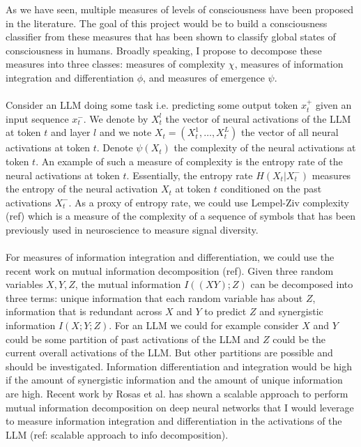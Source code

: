 \documentclass[11pt,a4paper]{article}
\begin{document}
As we have seen, multiple measures of levels of consciousness have been proposed in the literature. The goal of this project would be to build a consciousness classifier from these measures that has been shown to classify global states of consciousness in humans. Broadly speaking, I propose to decompose these measures into three classes: measures of complexity $\chi$, measures of information integration and differentiation $\phi$, and measures of emergence $\psi$. 
\\
\\
Consider an LLM doing some task i.e. predicting some output token $x_t^+$ given an input sequence $x_t^-$. We denote by $X_t^l$ the vector of neural activations of the LLM at token $t$ and layer $l$ and we note $X_t = (X_t^1, \ldots, X_t^L)$ the vector of all neural activations at token $t$. Denote $\psi(X_t)$ the complexity of the neural activations at token $t$. An example of such a measure of complexity is the entropy rate of the neural activations at token $t$. Essentially, the entropy rate $H(X_t | X_t^-)$ measures the entropy of the neural activation $X_t$ at token $t$ conditioned on the past activations $X_t^-$. As a proxy of entropy rate, we could use Lempel-Ziv complexity (ref) which is a measure of the complexity of a sequence of symbols that has been previously used in neuroscience to measure signal diversity.
\\
\\
For measures of information integration and differentiation, we could use the recent work on mutual information decomposition (ref). Given three random variables $X, Y, Z$, the mutual information $I((X Y);Z)$ can be decomposed into three terms: unique information that each random variable has about $Z$, information that is redundant across $X$ and $Y$ to predict $Z$ and synergistic information $I(X; Y; Z)$. For an LLM we could for example consider $X$ and $Y$ could be some partition of past activations of the LLM and $Z$ could be the current overall activations of the LLM. But other partitions are possible and should be investigated. Information differentiation and integration would be high if the amount of synergistic information and the amount of unique information are high. Recent work by Rosas et al. has shown a scalable approach to perform mutual information decomposition on deep neural networks that I would leverage to measure information integration and differentiation in the activations of the LLM (ref: scalable approach to info decomposition).
\end{document}

